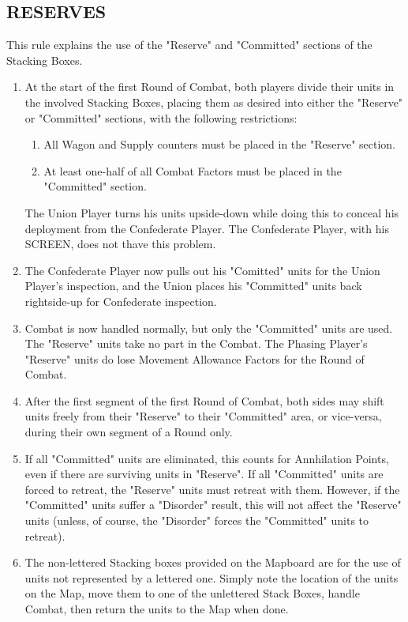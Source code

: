 \subsection{RESERVES}

This rule explains the use of the "Reserve" and "Committed" sections of the Stacking Boxes.

\begin{enumerate}[label=(\alph*)]
  \item At the start of the first Round of Combat, both players divide their units in the involved Stacking Boxes, placing them as desired into either the "Reserve" or "Committed" sections, with the following restrictions:
  \begin{enumerate}[label=(\roman*)]
    \item All Wagon and Supply counters must be placed in the "Reserve" section.
    \item At least one-half of all Combat Factors must be placed in the "Committed" section.
  \end{enumerate}
  The Union Player turns his units upside-down while doing this to conceal his deployment from the Confederate Player. The Confederate Player, with his SCREEN, does not thave this problem.

  \item The Confederate Player now pulls out his "Comitted" units for the Union Player's inspection, and the Union places his "Committed" units back rightside-up for Confederate inspection.

  \item Combat is now handled normally, but only the "Committed" units are used. The "Reserve" units take no part in the Combat. The Phasing Player's "Reserve" units do lose Movement Allowance Factors for the Round of Combat.

  \item After the first segment of the first Round of Combat, both sides may shift units freely from their "Reserve" to their "Committed" area, or vice-versa, during their own segment of a Round only.

  \item If all "Committed" units are eliminated, this counts for Annhilation Points, even if there are surviving units in "Reserve". If all "Committed" units are forced to retreat, the "Reserve" units must retreat with them. However, if the "Committed" units suffer a "Disorder" result, this will not affect the "Reserve" units (unless, of course, the "Disorder" forces the "Committed" units to retreat).

  \item The non-lettered Stacking boxes provided on the Mapboard are for the use of units not represented by a lettered one. Simply note the location of the units on the Map, move them to one of the unlettered Stack Boxes, handle Combat, then return the units to the Map when done.
\end{enumerate}
